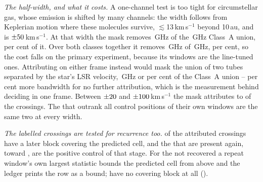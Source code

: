 \emph{The half-width, and what it costs.} A one-channel test is too tight for
circumstellar gas, whose emission is shifted by many channels: the width
follows from Keplerian motion where these molecules survive,
$\lesssim$13\,km\,s$^{-1}$ beyond 10\,au, and is
$\pm50$\,km\,s$^{-1}$. At that width the mask removes
\MkMaskAGHz\,GHz of the \CvUnionA\,GHz Class~A union, \MkMaskAPct{} per cent
of it. Over both classes together it removes \FrMaskLostGHz\,GHz of
\FrMaskUnionGHz\,GHz, \FrMaskPct{} per cent, so the cost falls on the primary
experiment, because its windows are the line-tuned ones.
Attributing on either frame instead would mask the union of two tubes
separated by the star's LSR velocity, \LsMaskTwoGHz\,GHz or
\LsMaskTwoPct{} per cent of the Class~A union -- \LsMaskAddPct{} per cent
more bandwidth for no further attribution, which is the measurement behind
deciding in one frame. Between $\pm20$ and
$\pm100$\,km\,s$^{-1}$ the mask attributes \FrAttrWTwenty{} to
\FrAttrWHundred{} of the crossings. The \FrNRankPass{} that outrank all
\NCtrl{} control positions of their own windows are the same two at every
width.

\emph{The labelled crossings are tested for recurrence too.} \MkAttrTested{}
of the \MkAttr{} attributed crossings have a later block covering the
predicted cell, and the \MkAttrRecur{} that are present again, toward
\MkAttrRecurStars, are the positive control of that stage. For the
\MkAttrExcl{} not recovered a repeat window's own largest statistic bounds
the predicted cell from above and the ledger prints the row as a
bound; \MkAttrUntest{} have no covering block at all
(\MkAttrUntestNames).
